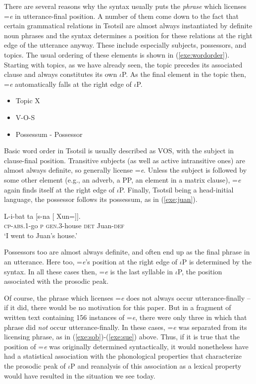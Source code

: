 \documentclass[output=paper,
modfonts
]{LSP/langsci}
\begin{document}
There are several reasons why the syntax usually puts the \emph{phrase} which licenses
=\emph{e} in utterance-final position. A number of them come down to the fact that certain grammatical relations in
Tsotsil are almost always instantiated by definite noun phrases and the syntax determines a position for
these relations at the right edge of the utterance anyway.  
These include especially subjects, possessors, and topics. The usual ordering of these elements is shown in (\ref{exe:wordorder}).
Starting with topics, as we have already seen, the topic precedes its associated clause and always constitutes its own $\iota$P.
As the final element in the topic then, =\emph{e} automatically falls at the right edge of $\iota$P.   
\begin{exe}
\ex
\begin{itemize}
\item[\textopenbullet]
Topic  X
\item[\textopenbullet]
V\--O\--S
\item[\textopenbullet]
Possessum \-- Possessor
\end{itemize}
\label{exe:wordorder}
\end{exe}
Basic word order in Tsotsil is usually described as VOS, with the subject in clause-final position. Transitive subjects (as well as active
intransitive ones) are almost always definite, so generally license =\emph{e}. Unless the subject is followed by some other element (e.g.,
an adverb, a PP, an element in a matrix clause), =\emph{e} again finds itself at the right edge of $\iota$P.
Finally, Tsotsil being a head-initial language, the possessor follows its possessum, as in (\ref{exe:juan}).
 \begin{exe}
 \ex\label{exe:juan}\bridgeoverex
 \gll L-i-bat ta [s-na [ Xun=]]. \\
 \textsc{cp-abs.1}-go \textsc{p} \textsc{gen.3}-house \textsc{det} Juan-\textsc{def} \\
 \glt `I went to Juan's house.'
 \end{exe} 
 Possessors too are almost always definite, and often end up as the final phrase in an utterance. Here too,
 =\emph{e}'s position at the right edge of $\iota$P is determined by the syntax. In all these cases then,
 =\emph{e} is the last syllable in $\iota$P, the position associated with the prosodic peak. 
  
 Of course, the phrase which licenses =\emph{e} does not always occur utterance-finally -- if it did, there would be no
 motivation for this paper.  But in a fragment of written text containing 156 instances of =\emph{e}, there were only three in which
 that phrase did \emph{not} occur utterance-finally. In these cases, 
  =\emph{e} was separated from its licensing phrase, as in  (\ref{exe:sob})-(\ref{exe:sue}) above. Thus, if it is true that
 the position of =\emph{e} was originally determined syntactically, it would nonetheless have had a
 statistical association with the phonological properties that characterize the prosodic peak of $\iota$P and
reanalysis of this association as a lexical property would have resulted in the situation we see today.  
\end{document}

